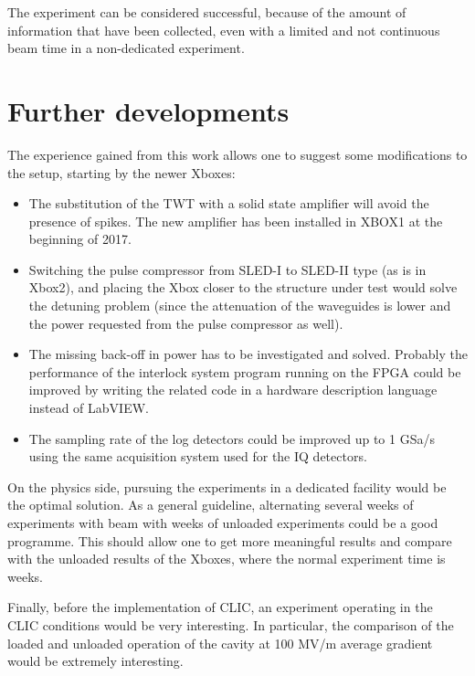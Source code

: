 The experiment can be considered successful, because of the amount of information that have been collected, even with a limited and not continuous beam time in a non-dedicated experiment.



\section[Further developments]{Further developments}

The experience gained from this work allows one to suggest some modifications to the setup, starting by the newer Xboxes:
\begin{itemize}
\item The substitution of the TWT with a solid state amplifier will avoid the presence of spikes. The new amplifier has been installed in XBOX1 at the beginning of 2017.
\item Switching the pulse compressor from SLED-I to SLED-II type (as is in Xbox2), and placing the Xbox closer to the structure under test would solve the detuning problem (since the attenuation of the waveguides is lower and the power requested from the pulse compressor as well).
\item The missing back-off in power has to be investigated and solved. Probably the performance of the interlock system program running on the FPGA could be improved by writing the related code in a hardware description language instead of LabVIEW.
\item The sampling rate of the log detectors could be improved up to 1 GSa/s using the same acquisition system used for the IQ detectors.
\end{itemize}

On the physics side, pursuing the experiments in a dedicated facility would be the optimal solution. As a general guideline, alternating several weeks of experiments with beam with weeks of unloaded experiments could be a good programme. This should allow one to get more meaningful results and compare with the unloaded results of the Xboxes, where the normal experiment time is weeks.

Finally, before the implementation of CLIC, an experiment operating in the CLIC conditions would be very interesting. In particular, the comparison of the loaded and unloaded operation of the cavity at 100 MV/m average gradient would be extremely interesting.